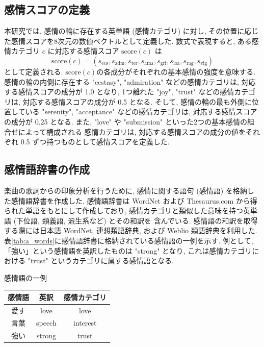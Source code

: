 \documentclass{jpreprint}
\begin{document}
\begin{multicols}{2}
\subsection{感情スコアの定義}\label{subsec:a_score}
本研究では,
感情の輪に存在する英単語 (感情カテゴリ) に対し,
その位置に応じた感情スコアを8次元の数値ベクトルとして定義した.
数式で表現すると,
ある感情カテゴリ $c$ に対応する感情スコア $\mathrm{score}(c)$ は
\[
\mathrm{score}(c) =
(
s_{\mathrm{ecs}}, 
s_{\mathrm{adm}},
s_{\mathrm{ter}},
s_{\mathrm{ama}},
s_{\mathrm{gri}},
s_{\mathrm{loa}},
s_{\mathrm{rag}},
s_{\mathrm{vig}}
)
\]
として定義される.
$\mathrm{score}(c)$の各成分がそれぞれの基本感情の強度を意味する.
感情の輪の内側に存在する "ecstasy", "admiration" などの感情カテゴリは,
対応する感情スコアの成分が 1.0 となり,
1つ離れた "joy", "trust" などの感情カテゴリは,
対応する感情スコアの成分が 0.5 となる.
そして,
感情の輪の最も外側に位置している "serenity", "acceptance" などの感情カテゴリは,
対応する感情スコアの成分が 0.25 となる.
また,
"love" や "submission" といった2つの基本感情の組合せによって構成される
感情カテゴリは,
対応する感情スコアの成分の値をそれぞれ 0.5 ずつ持つものとして感情スコアを定義した.


\subsection{感情語辞書の作成}
楽曲の歌詞からの印象分析を行うために,
感情に関する語句 (感情語) を格納した感情語辞書を作成した.
感情語辞書は 
WordNet\cite{WN} および Thesaurus.com\cite{TS}
から得られた単語をもとにして作成しており,
感情カテゴリと類似した意味を持つ英単語
(下位語, 類義語, 派生系など) とその和訳を
含んでいる.
感情語の和訳を取得する際には日本語 WordNet\cite{JPNWN},
連想類語辞典\cite{RUIGO},
および Weblio 類語辞典\cite{WEBLIO}を利用した.
表\ref{tab:a_words}に感情語辞書に格納されている感情語の一例を示す.
例として,
「強い」という感情語を英訳したものは "strong" となり,
これは感情カテゴリにおける "trust" というカテゴリに属する感情語となる.

\begin{tablehere}
  \begin{center}
  \caption{感情語の一例}
  \label{tab:a_words}
  \begin{tabular}{ccc}
    \hline
    \hline
    感情語 & 英訳 & 感情カテゴリ \\
    \hline
    愛す & love & love \\
    言葉 & speech & interest \\
    強い & strong & trust \\
    \hline
    \hline
  \end{tabular}
  \end{center}
\end{tablehere}


\end{multicols}
\end{document}
